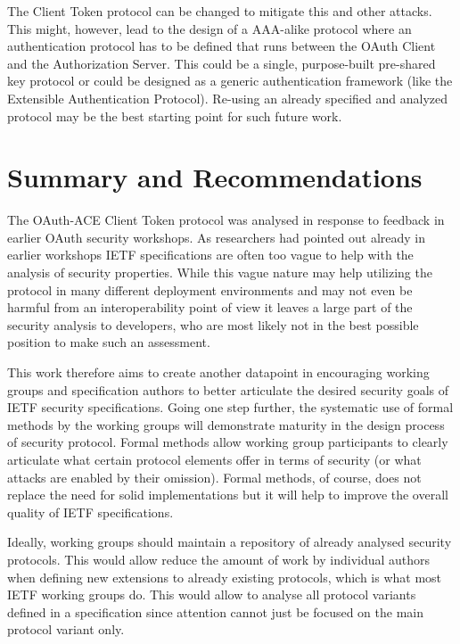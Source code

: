 \documentclass[peerreview, a4paper, 7pt]{IEEEtran}
\begin{document}
The Client Token protocol can be changed to mitigate this and other attacks. This might, however, lead to the design of a AAA-alike protocol where an authentication protocol has to be defined that runs between the OAuth Client and the Authorization Server. This could be a single, purpose-built pre-shared key protocol or could be designed as a generic authentication framework (like the Extensible Authentication Protocol). Re-using an already specified and analyzed protocol may be the best starting point for such future work. 

\section{Summary and Recommendations}

The OAuth-ACE Client Token protocol was analysed in response to feedback in earlier OAuth security workshops. As researchers had pointed out already in earlier workshops IETF specifications are often too vague to help with the analysis of security properties. While this vague nature may help utilizing the protocol in many different deployment environments and may not even be harmful from an interoperability point of view it leaves a large part of the security analysis to developers, who are most likely not in the best possible position to make such an assessment.

This work therefore aims to create another datapoint in encouraging working groups and specification authors to better articulate the desired security goals of IETF security specifications. Going one step further, the systematic use of formal methods by the working groups will demonstrate maturity in the design process of security protocol. Formal methods allow working group participants to clearly articulate what certain protocol elements offer in terms of security (or what attacks are enabled by their omission). Formal methods, of course, does not replace the need for solid implementations but it will help to improve the overall quality of IETF specifications. 

Ideally, working groups should maintain a repository of already analysed security protocols. This would allow reduce the amount of work by individual authors when defining new extensions to already existing protocols, which is what most IETF working groups do. This would allow to analyse all protocol variants defined in a specification since attention cannot just be focused on the main protocol variant only.
\end{document}
